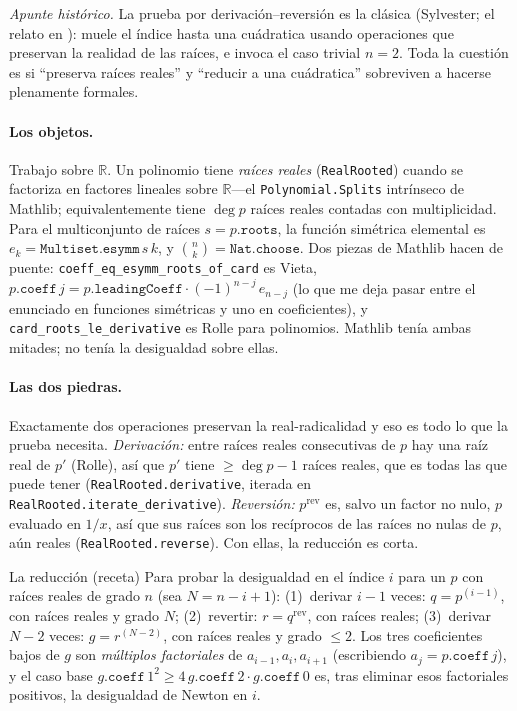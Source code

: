 \documentclass[11pt]{article}
\newcommand{\lean}[1]{\texttt{#1}}
\newcommand{\R}{\mathbb{R}}
\begin{document}
\emph{Apunte hist\'orico.} La prueba por derivaci\'on--reversi\'on es la cl\'asica (Sylvester; el
relato en \cite{HLP}): muele el \'indice hasta una cu\'adratica usando operaciones que preservan la
realidad de las ra\'ices, e invoca el caso trivial $n=2$. Toda la cuesti\'on es si ``preserva
ra\'ices reales'' y ``reducir a una cu\'adratica'' sobreviven a hacerse plenamente formales.

\paragraph{Los objetos.} Trabajo sobre $\R$. Un polinomio tiene \emph{ra\'ices reales}
(\lean{RealRooted}) cuando se factoriza en factores lineales sobre $\R$---el \lean{Polynomial.Splits}
intr\'inseco de Mathlib; equivalentemente tiene $\deg p$ ra\'ices reales contadas con
multiplicidad. Para el multiconjunto de ra\'ices $s=p.\mathtt{roots}$, la funci\'on sim\'etrica
elemental es $e_k=\lean{Multiset.esymm}\,s\,k$, y $\binom{n}{k}=\lean{Nat.choose}$. Dos piezas de
Mathlib hacen de puente: \lean{coeff\_eq\_esymm\_roots\_of\_card} es Vieta,
$p.\mathtt{coeff}\,j=p.\mathtt{leadingCoeff}\cdot(-1)^{n-j}\,e_{n-j}$ (lo que me deja pasar entre el
enunciado en funciones sim\'etricas y uno en coeficientes), y \lean{card\_roots\_le\_derivative} es
Rolle para polinomios. Mathlib ten\'ia ambas mitades; no ten\'ia la desigualdad sobre ellas.

\paragraph{Las dos piedras.} Exactamente dos operaciones preservan la real-radicalidad y eso es todo
lo que la prueba necesita. \emph{Derivaci\'on:} entre ra\'ices reales consecutivas de $p$ hay una
ra\'iz real de $p'$ (Rolle), as\'i que $p'$ tiene $\ge\deg p-1$ ra\'ices reales, que es todas las
que puede tener (\lean{RealRooted.derivative}, iterada en \lean{RealRooted.iterate\_derivative}).
\emph{Reversi\'on:} $p^{\mathrm{rev}}$ es, salvo un factor no nulo, $p$ evaluado en $1/x$, as\'i que
sus ra\'ices son los rec\'iprocos de las ra\'ices no nulas de $p$, a\'un reales
(\lean{RealRooted.reverse}). Con ellas, la reducci\'on es corta.

\begin{recipebox}{La reducci\'on (receta)}
Para probar la desigualdad en el \'indice $i$ para un $p$ con ra\'ices reales de grado $n$ (sea
$N=n-i+1$): (1)~derivar $i-1$ veces: $q=p^{(i-1)}$, con ra\'ices reales y grado $N$;
(2)~revertir: $r=q^{\mathrm{rev}}$, con ra\'ices reales;
(3)~derivar $N-2$ veces: $g=r^{(N-2)}$, con ra\'ices reales y grado $\le2$.
Los tres coeficientes bajos de $g$ son \emph{m\'ultiplos factoriales} de $a_{i-1},a_i,a_{i+1}$
(escribiendo $a_j=p.\mathtt{coeff}\,j$), y el caso base
$g.\mathtt{coeff}\,1^2\ge4\,g.\mathtt{coeff}\,2\cdot g.\mathtt{coeff}\,0$ es, tras eliminar esos
factoriales positivos, la desigualdad de Newton en $i$.
\end{recipebox}
\end{document}
